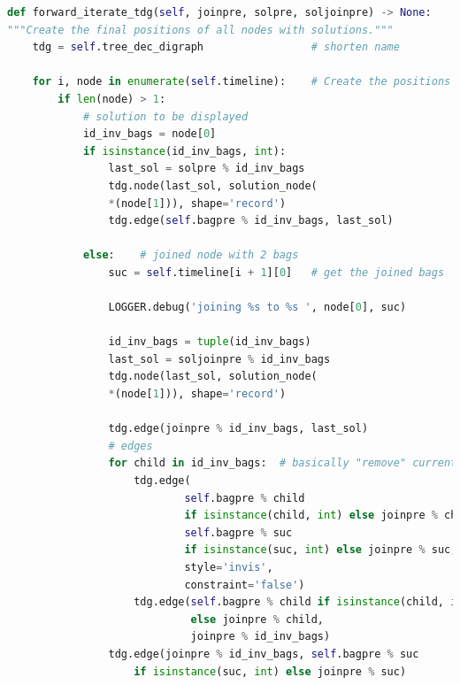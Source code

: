 \documentclass[a4paper, 12pt]{scrartcl}
\begin{document}
\begin{lstlisting}[language={Python}, caption={forward\_iterate\_tdg}, label={lst:forward-iterate}]
def forward_iterate_tdg(self, joinpre, solpre, soljoinpre) -> None:
"""Create the final positions of all nodes with solutions."""
	tdg = self.tree_dec_digraph                 # shorten name
	
	for i, node in enumerate(self.timeline):    # Create the positions
		if len(node) > 1:
			# solution to be displayed
			id_inv_bags = node[0]
			if isinstance(id_inv_bags, int):
				last_sol = solpre % id_inv_bags
				tdg.node(last_sol, solution_node(
				*(node[1])), shape='record')	
				tdg.edge(self.bagpre % id_inv_bags, last_sol)
			
			else:    # joined node with 2 bags
				suc = self.timeline[i + 1][0]   # get the joined bags
				
				LOGGER.debug('joining %s to %s ', node[0], suc)
				
				id_inv_bags = tuple(id_inv_bags)
				last_sol = soljoinpre % id_inv_bags
				tdg.node(last_sol, solution_node(
				*(node[1])), shape='record')
				
				tdg.edge(joinpre % id_inv_bags, last_sol)
				# edges
				for child in id_inv_bags:  # basically "remove" current
					tdg.edge(
							self.bagpre % child
							if isinstance(child, int) else joinpre % child,
							self.bagpre % suc
							if isinstance(suc, int) else joinpre % suc,
							style='invis',
							constraint='false')
					tdg.edge(self.bagpre % child if isinstance(child, int)
					         else joinpre % child,
					         joinpre % id_inv_bags)
				tdg.edge(joinpre % id_inv_bags, self.bagpre % suc
					if isinstance(suc, int) else joinpre % suc)
\end{lstlisting}
\end{document}
